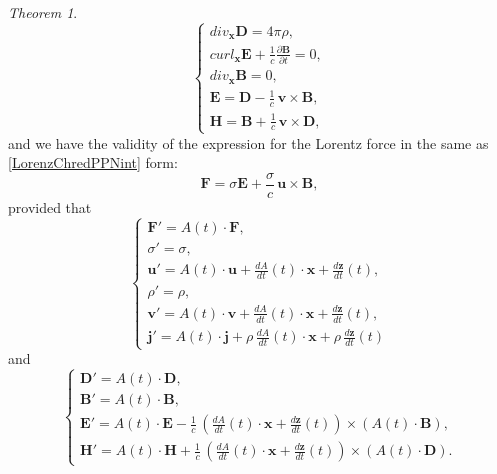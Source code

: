 \documentclass{article}
\newtheorem{theorem}{Theorem}[section]
\theoremstyle{definition}
\theoremstyle{remark}
\renewcommand{\vec}[1]{\mathbf{#1}}
\newcommand{\R}{\mathbb{R}}
\newcommand{\er}{\eqref}
\newcommand{\R}{{\mathbb{R}}}
\newcommand{\er}{\eqref}
\newtheorem{theorem}{Theorem}
\begin{document}
\begin{theorem}
\begin{equation}
\begin{cases}
div_{\vec x} \vec D= 4\pi\rho,\\
curl_{\vec x} \vec E+\frac{1}{c}\frac{\partial \vec B}{\partial t}= 0,\\
div_{\vec x} \vec B= 0,\\
\vec E=\vec D-\frac{1}{c}\,\vec v\times \vec B,\\
\vec H=\vec B+\frac{1}{c}\,\vec v\times \vec D,
\end{cases}
\end{equation}
and we have the validity of the expression for the Lorentz force in
the same as \er{LorenzChredPPNint} form:
\begin{equation}\label{LorenzChlljklljkint}
\vec F=\sigma \vec E+\frac{\sigma}{c}\,\vec u\times \vec B,
\end{equation}
provided that
\begin{equation}\label{yuythfgfyftydtydtydtyddyyyhhddhhhredPPN111hgghjgintint}
\begin{cases}
\vec F'=A(t)\cdot\vec F,\\
\sigma'=\sigma,\\
\vec u'=A(t)\cdot \vec u+\frac{dA}{dt}(t)\cdot\vec x+\frac{d\vec z}{dt}(t),\\
\rho'=\rho,\\
\vec v'=A(t)\cdot \vec v+\frac{dA}{dt}(t)\cdot\vec x+\frac{d\vec z}{dt}(t),\\
\vec j'=A(t)\cdot \vec j+\rho\, \frac{dA}{dt}(t)\cdot\vec
x+\rho\,\frac{d\vec z}{dt}(t)
\end{cases}
\end{equation}
and
\begin{equation}\label{yuythfgfyftydtydtydtyddyyyhhddhhhredPPN111hgghjgint}
\begin{cases}
\vec D'=A(t)\cdot \vec D,\\
\vec B'=A(t)\cdot\vec B,\\
\vec E'=A(t)\cdot\vec E-\frac{1}{c}\,\left(\frac{dA}{dt}(t)\cdot\vec
x+\frac{d\vec z}{dt}(t)\right)\times \left(A(t)\cdot\vec B\right),\\
\vec H'=A(t)\cdot\vec H+\frac{1}{c}\,\left(\frac{dA}{dt}(t)\cdot\vec
x+\frac{d\vec z}{dt}(t)\right)\times \left(A(t)\cdot\vec D\right).
\end{cases}
\end{equation}
\end{theorem}
\end{document}
